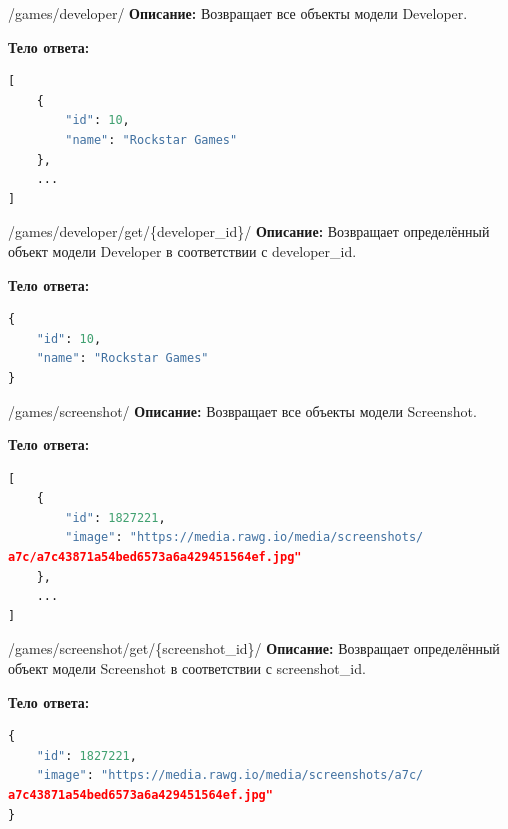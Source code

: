 \documentclass[a4paper,14pt]{extarticle}
\begin{document}
	\begin{getapi}{/games/developer/}
		\textbf{Описание:} Возвращает все объекты модели Developer.\medskip
		
		\textbf{Тело ответа:}
		\begin{lstlisting}[language=Python]
[
    {
        "id": 10,
        "name": "Rockstar Games"
    },
    ...
]
		\end{lstlisting}
	\end{getapi}
	
	\begin{getapi}{/games/developer/get/\{developer\_id\}/}
		\textbf{Описание:} Возвращает определённый объект модели Developer в соответствии с developer\_id.\medskip
		
		\textbf{Тело ответа:}
		\begin{lstlisting}[language=Python]
{
    "id": 10,
    "name": "Rockstar Games"
}
		\end{lstlisting}
	\end{getapi}
	
	\begin{getapi}{/games/screenshot/}
		\textbf{Описание:} Возвращает все объекты модели Screenshot.\medskip
		
		\textbf{Тело ответа:}
		\begin{lstlisting}[language=Python]
[
    {
        "id": 1827221,
        "image": "https://media.rawg.io/media/screenshots/
a7c/a7c43871a54bed6573a6a429451564ef.jpg"
    },
    ...
]
		\end{lstlisting}
	\end{getapi}
	
	\begin{getapi}{/games/screenshot/get/\{screenshot\_id\}/}
		\textbf{Описание:} Возвращает определённый объект модели Screenshot в соответствии с screenshot\_id.\medskip
		
		\textbf{Тело ответа:}
		\begin{lstlisting}[language=Python]
{
    "id": 1827221,
    "image": "https://media.rawg.io/media/screenshots/a7c/
a7c43871a54bed6573a6a429451564ef.jpg"
}
		\end{lstlisting}
	\end{getapi}
	
\end{document}
